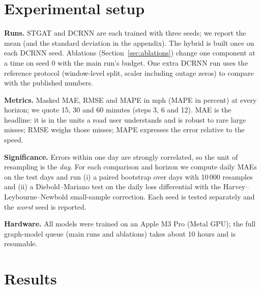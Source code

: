 \documentclass[11pt,a4paper]{article}
\begin{document}
\section{Experimental setup}\label{sec:setup}
\textbf{Runs.} STGAT and DCRNN are each trained with three seeds; we report the mean (and the standard deviation in the
appendix). The hybrid is built once on each DCRNN seed. Ablations (Section~\ref{sec:ablations}) change one component at
a time on seed 0 with the main run's budget. One extra DCRNN run uses the reference protocol (window-level split, scaler
including outage zeros) to compare with the published numbers.

\textbf{Metrics.} Masked MAE, RMSE and MAPE in mph (MAPE in percent) at every horizon; we quote 15, 30 and 60 minutes
(steps 3, 6 and 12). MAE is the headline: it is in the units a road user understands and is robust to rare large misses;
RMSE weighs those misses; MAPE expresses the error relative to the speed.

\textbf{Significance.} Errors within one day are strongly correlated, so the unit of resampling is the \emph{day}. For
each comparison and horizon we compute daily MAEs on the \TestDays{} test days and run (i) a paired bootstrap over days
with 10\,000 resamples and (ii) a Diebold--Mariano test on the daily loss differential with the Harvey--Leybourne--Newbold
small-sample correction. Each seed is tested separately and the \emph{worst} seed is reported.

\textbf{Hardware.} All models were trained on an Apple M3 Pro (Metal GPU); the full graph-model queue (main runs and
ablations) takes about 10 hours and is resumable.

\section{Results}\label{sec:results}
\end{document}
